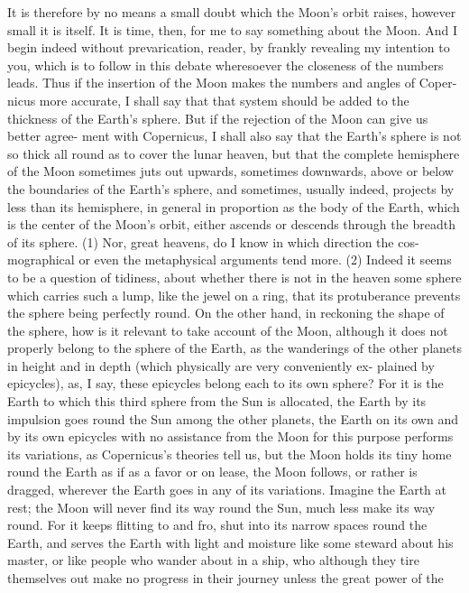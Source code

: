 \documentclass{article}
\begin{document}
{{{{{{{{{{{{{{{{{{{{{{{{{{{{{{{{{{{{{{{{{{{{{{{{{{{{{{{{{{{{{{{{{{{{{{{{{{{{{{{{{{{{{{{{{{{{{{{{{{{{{{{{{{{{{{{{{{{{{{{{{{{{{{It is therefore by no means a small doubt which the Moon’s orbit raises, however
small it is itself. It is time, then, for me to say something about the Moon. And I
begin indeed without prevarication, reader, by frankly revealing my intention to
you, which is to follow in this debate wheresoever the closeness of the numbers
leads. Thus if the insertion of the Moon makes the numbers and angles of Coper-
nicus more accurate, I shall say that that system should be added to the thickness
of the Earth’s sphere. But if the rejection of the Moon can give us better agree-
ment with Copernicus, I shall also say that the Earth’s sphere is not so thick all
round as to cover the lunar heaven, but that the complete hemisphere of the
Moon sometimes juts out upwards, sometimes downwards, above or below the
boundaries of the Earth’s sphere, and sometimes, usually indeed, projects by less
than its hemisphere, in general in proportion as the body of the Earth, which is
the center of the Moon’s orbit, either ascends or descends through the breadth of
its sphere. (1) Nor, great heavens, do I know in which direction the cos-
mographical or even the metaphysical arguments tend more. (2) Indeed it
seems to be a question of tidiness, about whether there is not in the heaven some
sphere which carries such a lump, like the jewel on a ring, that its protuberance
prevents the sphere being perfectly round. On the other hand, in reckoning the
shape of the sphere, how is it relevant to take account of the Moon, although it
does not properly belong to the sphere of the Earth, as the wanderings of the
other planets in height and in depth (which physically are very conveniently ex-
plained by epicycles), as, I say, these epicycles belong each to its own sphere? For
it is the Earth to which this third sphere from the Sun is allocated, the Earth by its
impulsion goes round the Sun among the other planets, the Earth on its own and
by its own epicycles with no assistance from the Moon for this purpose performs
its variations, as Copernicus’s theories tell us, but the Moon holds its tiny home
round the Earth as if as a favor or on lease, the Moon follows, or rather is
dragged, wherever the Earth goes in any of its variations. Imagine the Earth at
rest; the Moon will never find its way round the Sun, much less make its way
round. For it keeps flitting to and fro, shut into its narrow spaces round the
Earth, and serves the Earth with light and moisture like some steward about his
master, or like people who wander about in a ship, who although they tire
themselves out make no progress in their journey unless the great power of the
}}}}}}}}}}}}}}}}}}}}}}}}}}}}}}}}}}}}}}}}}}}}}}}}}}}}}}}}}}}}}}}}}}}}}}}}}}}}}}}}}}}}}}}}}}}}}}}}}}}}}}}}}}}}}}}}}}}}}}}}}}}}}}
\end{document}
